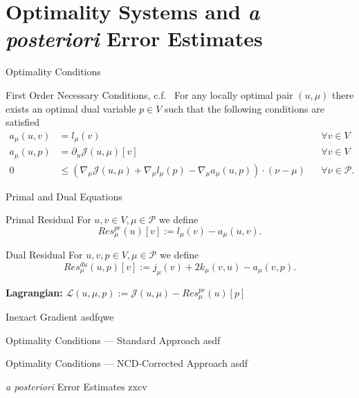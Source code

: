 \section{Optimality Systems and \textit{a posteriori} Error Estimates}

\begin{frame}{Optimality Conditions}
    \begin{block}{First Order Necessary Conditions, c.f.~\cite{Keil2021}}
        For any locally optimal pair $(u, \mu)$ there exists an optimal dual variable $p \in V$ such that the following conditions are satisfied
        \begin{align*}
            a_\mu(u, v) &= l_\mu(v) &&\forall v \in V \\
            a_\mu(u, p) &= \partial_u \mathcal{J}(u, \mu)[v] &&\forall v \in V \\
            0 &\leq (\nabla_\mu \mathcal{J}(u, \mu) + \nabla_\mu l_\mu(p) - \nabla_\mu a_\mu(u, p)) \cdot (\nu - \mu) &&\forall \nu \in \mathcal{P}.
        \end{align*}
    \end{block}
\end{frame}

\begin{frame}{Primal and Dual Equations}
    \begin{block}{Primal Residual}
        For $u, v \in V, \mu \in \mathcal{P}$ we define
        \begin{equation*}
            Res_\mu^{pr}(u)[v] := l_\mu(v) - a_\mu(u, v).
        \end{equation*}
    \end{block}
    \begin{block}{Dual Residual}
        For $u, v, p \in V, \mu \in \mathcal{P}$ we define
        \begin{equation*}
            Res_\mu^{du}(u, p)[v] := j_\mu(v) + 2 k_\mu(v, u) - a_\mu(v, p).
        \end{equation*}
    \end{block}
    \textbf{Lagrangian:} $\mathcal{L}(u, \mu, p) := \mathcal{J}(u, \mu) - Res_\mu^{pr}(u)[p]$
\end{frame}

\begin{frame}{Inexact Gradient}
    asdfqwe
\end{frame}

\begin{frame}{Optimality Conditions --- Standard Approach}
    asdf
\end{frame}

\begin{frame}{Optimality Conditions --- NCD-Corrected Approach}
    asdf
\end{frame}

\begin{frame}{\textit{a posteriori} Error Estimates}
    zxcv
\end{frame}